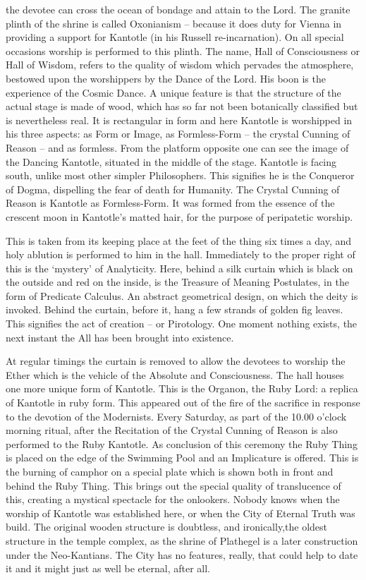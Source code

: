 \documentclass[10pt,titlepage]{book}
\begin{document}
the devotee can cross the ocean of bondage and attain to the Lord. The
granite plinth of the shrine is called Oxonianism -- because it does
duty for Vienna in providing a support for Kantotle (in his Russell
re-incarnation). On all special occasions worship is performed to this
plinth. The name, Hall of Consciousness or Hall of Wisdom, refers to
the quality of wisdom which pervades the atmosphere, bestowed upon the
worshippers by the Dance of the Lord. His boon is the experience of the
Cosmic Dance. A unique feature is that the structure of the actual
stage is made of wood, which has so far not been botanically classified
but is nevertheless real. It is rectangular in form and here Kantotle
is worshipped in his three aspects: as Form or Image, as Formless-Form
-- the crystal Cunning of Reason -- and as formless. From the platform
opposite one can see the image of the Dancing Kantotle, situated in the
middle of the stage. Kantotle is facing south, unlike most other
simpler Philosophers. This signifies he is the Conqueror of Dogma,
dispelling the fear of death for Humanity. The Crystal Cunning of
Reason is Kantotle as Formless-Form. It was formed from the essence of
the crescent moon in Kantotle's matted hair, for the purpose of
peripatetic worship.

This is taken from its keeping place at the feet of the thing six times
a day, and holy ablution is performed to him in the hall. Immediately
to the proper right of this is the ‘mystery’ of Analyticity. Here,
behind a silk curtain which is black
on the outside and red on the inside, is the Treasure of Meaning
Postulates, in the form of Predicate Calculus. An abstract geometrical
design, on which the deity is invoked. Behind the curtain, before it,
hang a few strands of golden fig leaves. This signifies the act of
creation -- or Pirotology. One moment nothing exists, the next instant
the All has been brought into existence.

At regular timings the curtain is removed to allow the devotees to
worship the Ether which is the vehicle of the Absolute and
Consciousness. The hall houses one more unique form of Kantotle. This
is the Organon, the Ruby Lord: a replica of Kantotle in ruby form. This
appeared out of the fire of the sacrifice in response to the devotion
of the Modernists. Every Saturday, as part of the 10.00 o’clock morning
ritual, after the Recitation of the Crystal Cunning of Reason is also
performed to the Ruby Kantotle. As conclusion of this ceremony the Ruby
Thing is placed on the edge of the Swimming Pool and an Implicature is
offered. This is the burning of camphor on a special plate which is
shown both in front and behind the Ruby Thing. This brings out the
special quality of translucence of this, creating a mystical spectacle
for the onlookers. Nobody knows when the worship of Kantotle was
established here, or when the City of Eternal Truth was build. The
original wooden structure is doubtless, and ironically,the oldest
structure in the temple complex,
as the shrine of Plathegel is a later construction under the
Neo-Kantians. The City has no features, really, that could help to date
it and it might just as well be eternal, after all.
\end{document}
